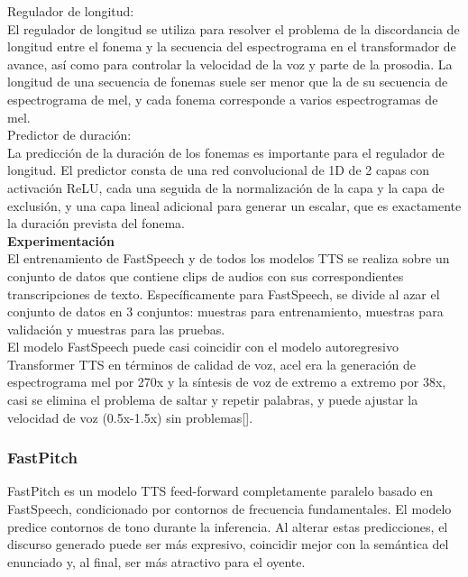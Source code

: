 Regulador de longitud: \\
El regulador de longitud se utiliza para resolver el problema de la discordancia de longitud entre el fonema y la secuencia del espectrograma en el transformador de avance, así como para controlar la velocidad de la voz y parte de la prosodia. La longitud de una secuencia de fonemas suele ser menor que la de su secuencia de espectrograma de mel, y cada fonema corresponde a varios espectrogramas de mel. \\

Predictor de duración: \\
La predicción de la duración de los fonemas es importante para el regulador de longitud.
El predictor consta de una red convolucional de 1D de 2 capas con activación ReLU, cada una seguida de la normalización de la capa y la capa de exclusión, y una capa lineal adicional para generar un escalar, que es exactamente la duración prevista del fonema.\\

\textbf{Experimentación}\\

El entrenamiento de FastSpeech y de todos los modelos TTS se realiza sobre un conjunto de datos que contiene clips de audios con sus correspondientes transcripciones de texto. Específicamente para FastSpeech, se divide al azar el conjunto de datos en 3 conjuntos: muestras para entrenamiento, muestras para validación y muestras para las pruebas. \\


El modelo FastSpeech puede casi coincidir con el modelo autoregresivo Transformer TTS en términos de calidad de voz, acel
era la generación de espectrograma mel por 270x y la síntesis de voz de extremo a extremo por 38x, casi se elimina el problema de saltar y repetir palabras, y puede ajustar la velocidad de voz (0.5x-1.5x) sin problemas[\cite{ren2019fastspeech}].


\subsubsection{FastPitch}
FastPitch es un modelo TTS feed-forward completamente paralelo basado en FastSpeech, condicionado por contornos de frecuencia fundamentales. El modelo predice contornos de tono durante la inferencia. Al alterar estas predicciones, el discurso generado puede ser más expresivo, coincidir mejor con la semántica del enunciado y, al final, ser más atractivo para el oyente.

